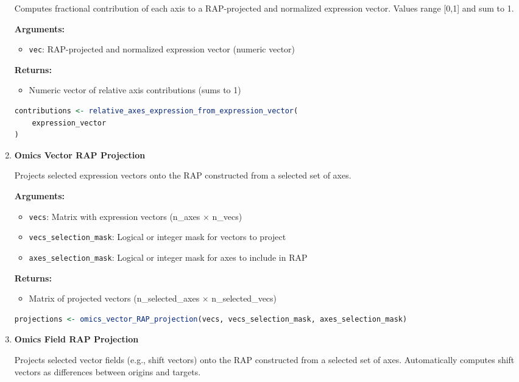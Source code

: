 \documentclass[11pt]{article}
\begin{document}
\begin{enumerate}
    Computes fractional contribution of each axis to a RAP-projected and normalized expression vector. Values range [0,1] and sum to 1.
    
    \textbf{Arguments:}
    \begin{itemize}
        \item \texttt{vec}: RAP-projected and normalized expression vector (numeric vector)
    \end{itemize}
    \textbf{Returns:}
    \begin{itemize}
        \item Numeric vector of relative axis contributions (sums to 1)
    \end{itemize}
\begin{lstlisting}[language=R, caption={Expression Vector Axis Contributions}]
contributions <- relative_axes_expression_from_expression_vector(
    expression_vector
)
\end{lstlisting}

    \item \textbf{Omics Vector RAP Projection}

    Projects selected expression vectors onto the RAP constructed from a selected set of axes.
    
    \textbf{Arguments:}
    \begin{itemize}
        \item \texttt{vecs}: Matrix with expression vectors (n\_axes × n\_vecs)
        \item \texttt{vecs\_selection\_mask}: Logical or integer mask for vectors to project
        \item \texttt{axes\_selection\_mask}: Logical or integer mask for axes to include in RAP
    \end{itemize}
    \textbf{Returns:}
    \begin{itemize}
        \item Matrix of projected vectors (n\_selected\_axes × n\_selected\_vecs)
    \end{itemize}
\begin{lstlisting}[language=R, caption={Vector RAP Projection}]
projections <- omics_vector_RAP_projection(vecs, vecs_selection_mask, axes_selection_mask)
\end{lstlisting}

    \item \textbf{Omics Field RAP Projection}

    Projects selected vector fields (e.g., shift vectors) onto the RAP constructed from a selected set of axes. Automatically computes shift vectors as differences between origins and targets.
    

\end{enumerate}
\end{document}
